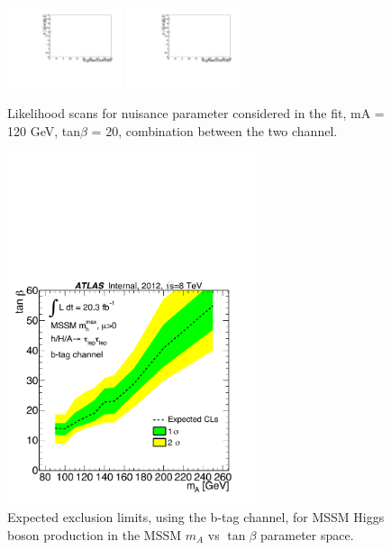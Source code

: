 \begin{figure}[htp]
\begin{center}
            \includegraphics[page=51,width=0.3\textwidth]{figure/np_check/comb_LLHscan.pdf}
            \includegraphics[page=52,width=0.3\textwidth]{figure/np_check/comb_LLHscan.pdf}\\

    \end{center}
    \caption{ Likelihood scans for nuisance parameter considered in the fit,  mA = 120 GeV, tan$\beta$ = 20, combination between the two channel.} 
    \label{fig:llh_3}
\end{figure}

\begin{figure}[]
  \centering
  \includegraphics[width=0.65\textwidth]{figure/limits/Limits_mAtanBeta_BTag.pdf}
  \caption{Expected %
  exclusion limits, using the b-tag channel, for MSSM Higgs boson production 
in the MSSM $m_A$ vs $\tan\beta$ parameter space.}
\label{fig:limit_extract_combined}
\end{figure}

